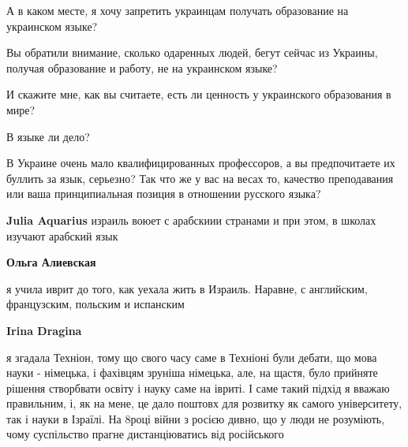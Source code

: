 \begin{itemize}
\begin{itemize}
А в каком месте, я хочу запретить украинцам получать образование на украинском
языке?

Вы обратили внимание, сколько одаренных людей, бегут сейчас из Украины, получая
образование и работу, не на украинском языке?

И скажите мне, как вы считаете, есть ли ценность у украинского образования в
мире?

В языке ли дело?

В Украине очень мало квалифицированных профессоров, а вы предпочитаете их
буллить за язык, серьезно? Так что же у вас на весах то, качество преподавания
или ваша принципиальная позиция в отношении русского языка?

 
\textbf{Julia Aquarius} израиль воюет с арабскиии странами и при этом, в школах изучают арабский язык

 
\textbf{Ольга Алиевская} 

я учила иврит до того, как уехала жить в Израиль. Наравне, с английским,
французским, польским и испанским

 
\textbf{Irina Dragina} 

я згадала Техніон, тому що свого часу саме в Техніоні були дебати, що мова
науки - німецька, і фахівцям зруніша німецька, але, на щастя, було прийняте
рішення створбвати освіту і науку саме на івриті. І саме такий підхід я вважаю
правильним, і, як на мене, це дало поштовх для розвитку як самого університету,
так і науки в Ізраїлі. На 8році війни з росією дивно, що у люди не розуміють,
чому суспільство прагне дистанціюватись від російського

 

\end{itemize}
\end{itemize}
